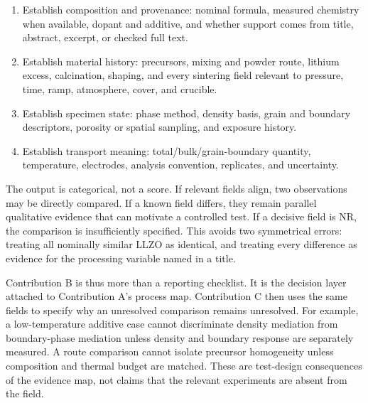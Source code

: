 \begin{enumerate}
\item Establish composition and provenance: nominal formula, measured chemistry when available, dopant and additive, and whether support comes from title, abstract, excerpt, or checked full text.
\item Establish material history: precursors, mixing and powder route, lithium excess, calcination, shaping, and every sintering field relevant to pressure, time, ramp, atmosphere, cover, and crucible.
\item Establish specimen state: phase method, density basis, grain and boundary descriptors, porosity or spatial sampling, and exposure history.
\item Establish transport meaning: total/bulk/grain-boundary quantity, temperature, electrodes, analysis convention, replicates, and uncertainty.
\end{enumerate}

The output is categorical, not a score. If relevant fields align, two observations may be directly compared. If a known field differs, they remain parallel qualitative evidence that can motivate a controlled test. If a decisive field is NR, the comparison is insufficiently specified. This avoids two symmetrical errors: treating all nominally similar LLZO as identical, and treating every difference as evidence for the processing variable named in a title.

Contribution B is thus more than a reporting checklist. It is the decision layer attached to Contribution A's process map. Contribution C then uses the same fields to specify why an unresolved comparison remains unresolved. For example, a low-temperature additive case cannot discriminate density mediation from boundary-phase mediation unless density and boundary response are separately measured. A route comparison cannot isolate precursor homogeneity unless composition and thermal budget are matched. These are test-design consequences of the evidence map, not claims that the relevant experiments are absent from the field.
